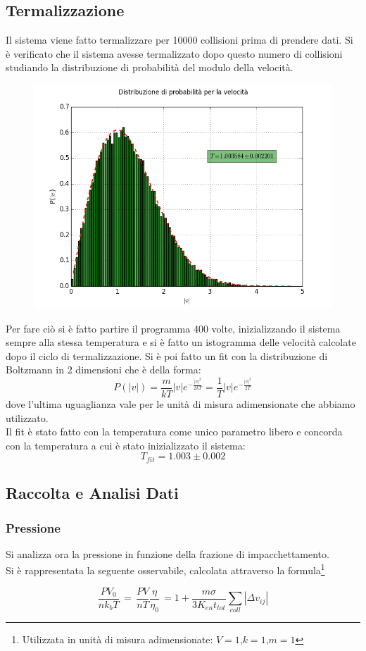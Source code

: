 \subsection{Termalizzazione}
Il sistema viene fatto termalizzare per 10000 collisioni prima di prendere dati.
Si è verificato che il sistema avesse termalizzato dopo questo numero di collisioni studiando la distribuzione di probabilità del modulo della velocità.\\
\begin{figure}[ht]
	\centering
	\includegraphics[scale=0.5]{sfere2D/boltzmann.png}
\end{figure}

Per fare ciò si è fatto partire il programma 400 volte, inizializzando il sistema sempre alla stessa temperatura e si è fatto un istogramma delle velocità calcolate dopo il ciclo di termalizzazione.
Si è poi fatto un fit con la distribuzione di Boltzmann in 2 dimensioni che è della forma:
$$
	P(|v|) = \frac{m}{k T} |v| e^{ - \frac{|v|^2}{2 k T}} = \frac{1}{T} |v| e^{ - \frac{|v|^2}{2T}}
$$
dove l'ultima uguaglianza vale per le unità di misura adimensionate che abbiamo utilizzato.\\
Il fit è stato fatto con la temperatura come unico parametro libero e concorda con la temperatura a cui è stato inizializzato il sistema:
$$
	T_{fit} = 1.003 \pm 0.002
$$

\subsection{Raccolta e Analisi Dati}
\subsubsection{Pressione}
Si analizza ora la pressione in funzione della frazione di impacchettamento.\\
Si è rappresentata la seguente osservabile, calcolata attraverso la formula\footnote{Utilizzata in unità di misura adimensionate: $V=1$,$k=1$,$m=1$}
\begin{center}
$$
	\frac{P V_0}{n k_{b} T} \, =\,  \frac{PV}{nT}\frac{\eta}{\eta_0} \, = 1 + \frac{m \sigma}{3 K_{en} t_{tot}} \sum_{coll} | \Delta v_{ij}| 
$$
\end{center}


